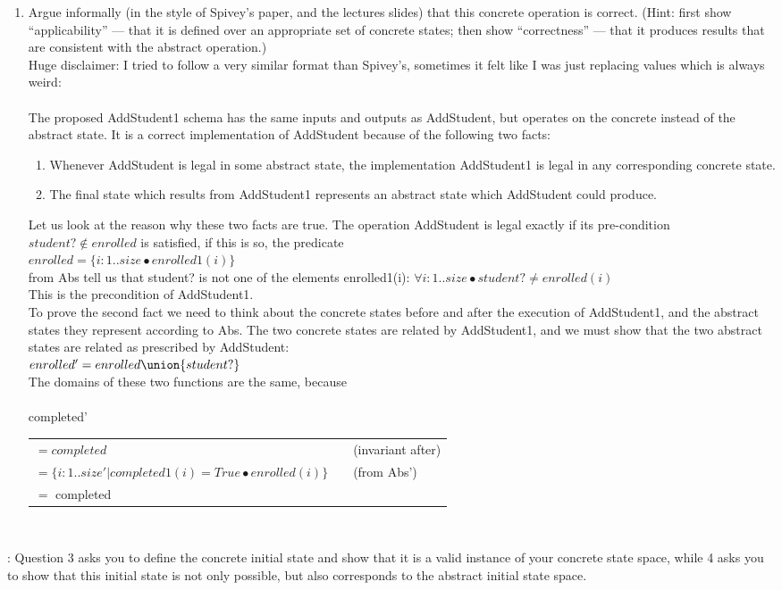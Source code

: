 \documentclass{article}
\begin{document}
\begin{enumerate}
\item Argue informally (in the style of Spivey's paper, and the
lectures slides) that this concrete operation is correct. ({\sc Hint}:
first show ``applicability'' --- that it is defined over an
appropriate set of concrete states; then show ``correctness'' --- that it produces
results that are consistent with the abstract operation.) \\
\color{blue}
Huge disclaimer: I tried to follow a very similar format than Spivey's, sometimes it felt like I was just replacing values which is always weird: \\
\\
The proposed AddStudent1 schema has the same inputs and outputs as AddStudent, but operates on the concrete instead of the abstract state. It is a correct implementation of AddStudent because of the following two facts:
\begin{enumerate}
\item Whenever AddStudent is legal in some abstract state, the implementation AddStudent1 is legal in any corresponding concrete state.
\item The final state which results from AddStudent1 represents an abstract state which AddStudent could produce.
\end{enumerate}
Let us look at the reason why these two facts are true. The operation AddStudent is legal exactly if its pre-condition $student? \notin enrolled$ is satisfied, if this is so, the predicate \\
$enrolled = \{i:1..size \bullet enrolled1(i)\}$ \\
from Abs tell us that student? is not one of the elements enrolled1(i):
$\forall i:1..size \bullet student? \neq enrolled(i)$ \\
This is the precondition of AddStudent1. \\
To prove the second fact we need to think about the concrete states before and after the execution of AddStudent1, and the abstract states they represent according to Abs. The two concrete states are related by AddStudent1, and we must show that the two abstract states are related as prescribed by AddStudent: \\
$enrolled' = enrolled \union \{student?\}$ \\

The domains of these two functions are the same, because \\
\\
completed'\\
\begin{tabular}{lll}
$= completed$ & & (invariant after)\\
$= \{i:1..size' | completed1(i) = True \bullet enrolled(i) \}$ & & (from Abs') \\
$=$ completed \\ 
\end{tabular}
\\

\end{enumerate}

\color{black}

: Question 3 asks you to define the concrete initial state and show that it is a valid instance of your concrete state space, while 4 asks you to show that this initial state is not only possible, but also corresponds to the abstract initial state space.
\end{document}
